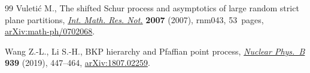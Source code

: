 \documentclass[11pt]{article}
\numberwithin{equation}{section}
\numberwithin{equation}{section}
\begin{document}
\begin{thebibliography}{99}
Vuleti\'c M., The shifted {S}chur process and asymptotics of large random
 strict plane partitions, \href{https://doi.org/10.1093/imrn/rnm043}{\textit{Int. Math. Res. Not.}} \textbf{2007} (2007),
 rnm043, 53~pages, \href{https://arxiv.org/abs/math-ph/0702068}{arXiv:math-ph/0702068}.

Wang Z.-L., Li S.-H., B{KP} hierarchy and {P}faffian point process,
 \href{https://doi.org/10.1016/j.nuclphysb.2018.12.028}{\textit{Nuclear Phys.~B}} \textbf{939} (2019), 447--464, \href{https://arxiv.org/abs/1807.02259}{arXiv:1807.02259}.

\end{thebibliography}
\end{document}
